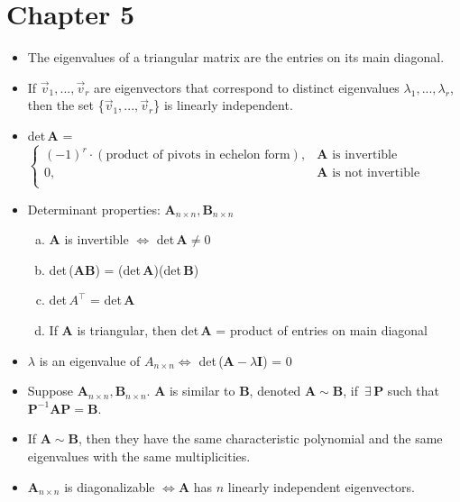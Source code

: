 \documentclass[11pt]{article}
\newcommand{\Thm}{\fbox{Thm}}
\newcommand{\Def}{\fbox{Def}}
\newcommand{\Fact}{\fbox{Fact}}
\newcommand{\A}{\mathbf{A}}
\newcommand{\B}{\mathbf{B}}
\newcommand{\I}{\mathbf{I}}
\begin{document}
\section{Chapter 5}
\begin{itemize}

\item[\Thm] The eigenvalues of a triangular matrix are the entries on its main diagonal.

\item[\Thm] If $\vec{v}_1,...,\vec{v}_r$ are eigenvectors that correspond to distinct 
eigenvalues $\lambda_1,...,\lambda_r$, then the set \{$\vec{v}_1,...,\vec{v}_r$\} is 
linearly independent.

\item[\fbox{Fact}] det\,$\A$ = 
$\begin{cases} 
      (-1)^r \cdot (\text{product of pivots in echelon form}), & \A \text{ is invertible} \\
      0, & \A \text{ is not invertible} \\
   \end{cases}
$

\item[\Thm] Determinant properties: $\A_{n \times n}, \B_{n \times n}$
\begin{enumerate} [a)]
  \item $\A$ is invertible $\iff$ det\,$\A \neq 0$
  \item det\,($\A \B$) = (det\,$\A$)(det\,$\B$)
  \item det\,$A^\intercal$ = det\,$\A$
  \item If $\A$ is triangular, then det\,$\A$ = product of entries on main diagonal
\end{enumerate}

\item[\Fact] $\lambda$ is an eigenvalue of $A_{n \times n} \iff$ det\,($\A - \lambda \I$) = 0 

\item[\Def] Suppose $\A_{n \times n}, \B_{n \times n}$. $\A$ is similar to $\B$, 
denoted $\A \sim \B$, if $\, \exists \, \mathbf{P}$ such that 
$\mathbf{P}^{-1} \A \mathbf{P} = \B$.

\item[\Thm] If $\A \sim \B$, then they have the same characteristic polynomial and the same 
eigenvalues with the same multiplicities.

\item[\Thm] $\A_{n \times n}$ is diagonalizable $\iff \A $ has $n$ linearly independent
eigenvectors.


\end{itemize}
\end{document}
